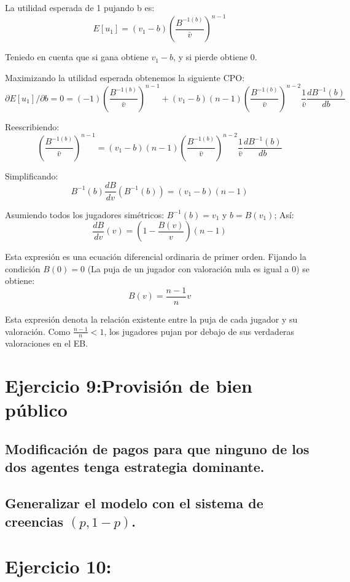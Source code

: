 \documentclass{article}
\begin{document}
La utilidad esperada de 1 pujando b es:
$$E[u_1]=(v_1-b)(\frac{B^{-1(b)}}{\bar{v}})^{n-1}$$

Teniedo en cuenta que si gana obtiene $v_1-b$, y si pierde obtiene 0.

Maximizando la utilidad esperada obtenemos la siguiente CPO:
$$\partial E[u_1]/\partial b=0=(-1)(\frac{B^{-1(b)}}{\bar{v}})^{n-1}+(v_1-b)(n-1)(\frac{B^{-1(b)}}{\bar{v}})^{n-2}\frac{1}{\bar{v}}\frac{dB^{-1}(b)}{db}$$

Reescribiendo:
$$(\frac{B^{-1(b)}}{\bar{v}})^{n-1}=(v_1-b)(n-1)(\frac{B^{-1(b)}}{\bar{v}})^{n-2}\frac{1}{\bar{v}}\frac{dB^{-1}(b)}{db}$$

Simplificando:
$$B^{-1}(b)\frac{dB}{dv}(B^{-1}(b))=(v_1-b)(n-1)$$

Asumiendo todos los jugadores sim\'etricos: $B^{-1}(b)=v_1$ y $b=B(v_1)$; As\'i:
$$\frac{dB}{dv}(v)=(1-\frac{B(v)}{v})(n-1)$$

Esta expresi\'on es una ecuaci\'on diferencial ordinaria de primer orden. Fijando la condici\'on $B(0)=0$ (La puja de un jugador con valoraci\'on nula es igual a 0) se obtiene:
$$B(v)=\frac{n-1}{n}v$$

Esta expresi\'on denota la relaci\'on existente entre la puja de cada jugador y su valoraci\'on. Como $\frac{n-1}{n}<1$, los jugadores pujan por debajo de sus verdaderas valoraciones en el EB.



\section{Ejercicio 9:Provisi\'on de bien p\'ublico}
\subsection{Modificaci\'on de pagos para que ninguno de los dos agentes tenga estrategia dominante.}
\subsection{Generalizar el modelo con el sistema de creencias $(p,1-p)$.}
\section{Ejercicio 10:}
\end{document}
